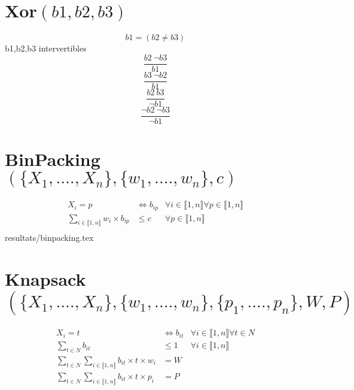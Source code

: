 \documentclass{article}
\newcommand{\binpacking}{BinPacking$(\{X_1,.\ldots,X_n\}, \{w_1, .\ldots, w_n\}, c)~$}
\newcommand{\knapsack}{\large Knapsack$(\{X_1, .\ldots, X_n\}, \{w_1, .\ldots, w_n\}, \{p_1, .\ldots, p_n\}, W, P)~$}
\newcommand{\I}{i\in\llbracket1,n\rrbracket}
\newcommand{\PP}{p\in\llbracket1,n\rrbracket}
\newcommand{\fai}{\forall\I}
\newcommand{\fap}{\forall\PP}
\begin{document}
\section{\texorpdfstring{Xor$(b1,b2,b3)$}{xor}}
$$b1=(b2\neq b3)$$
b1,b2,b3 intervertibles
$$\frac{b2~\neg b3}{b1}$$
$$\frac{b3~\neg b2}{b1}$$
$$\frac{b2~ b3}{\neg b1}$$
$$\frac{\neg b2~\neg b3}{\neg b1}$$

\section{\texorpdfstring{\binpacking}{binpacking}}
\begin{align*}
    X_i=p & \iff b_{ip}& \fai \fap\\
    \sum_{\I} w_i \times b_{ip} & \leq c & \fap\\
\end{align*}
{resultats/binpacking.tex}

\section{\texorpdfstring{\knapsack}{knapsack}}
\begin{align*}
    X_i=t &\iff b_{it}& \fai \forall t \in N\\
    \sum_{t\in N} b_{it} & \leq 1 & \fai\\
    \sum_{t\in N}\sum_{\I}b_{it} \times t \times w_i & =W \\
    \sum_{t\in N}\sum_{\I}b_{it} \times t \times p_i & =P
\end{align*}
\end{document}
